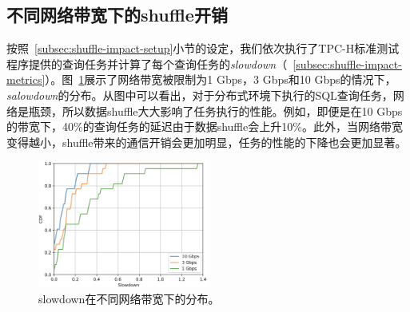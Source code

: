 \subsection{不同网络带宽下的shuffle开销}

\par 按照~\ref{subsec:shuffle-impact-setup}小节的设定，我们依次执行了TPC-H标准测试程序提供的查询任务并计算了每个查询任务的\emph{slowdown}（~\ref{subsec:shuffle-impact-metrics}）。图~\ref{fig:cdf16-all}展示了网络带宽被限制为1 Gbps，3 Gbps和10 Gbps的情况下，\emph{salowdown}的分布。从图中可以看出，对于分布式环境下执行的SQL查询任务，网络是瓶颈，所以数据shuffle大大影响了任务执行的性能。例如，即便是在10 Gbps的带宽下，40\%的查询任务的延迟由于数据shuffle会上升10\%。此外，当网络带宽变得越小，shuffle带来的通信开销会更加明显，任务的性能的下降也会更加显著。



\begin{figure}[]
	\centering
	\includegraphics[width=0.5\textwidth]{img/motivation/cdf16-all}
	
	\caption{slowdown在不同网络带宽下的分布。}
	\label{fig:cdf16-all}
\end{figure}